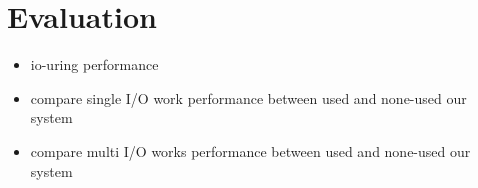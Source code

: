 \documentclass[conference]{IEEEtran}
\begin{document}





\section{Evaluation}
\begin{itemize}
    \item io-uring performance
    \item compare single I/O work performance between used and none-used our system 
    \item compare multi I/O works performance between used and none-used our system 
\end{itemize}
\end{document}

